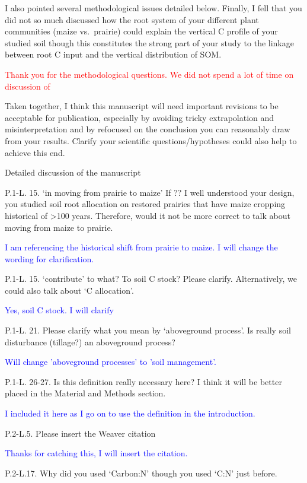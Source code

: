 \documentclass[]{article}
\begin{document}
I also pointed several methodological issues detailed below. Finally, I
fell that you did not so much discussed how the root system of your
different plant communities (maize vs.~prairie) could explain the
vertical C profile of your studied soil though this constitutes the
strong part of your study to the linkage between root C input and the
vertical distribution of SOM.

\textcolor{red}{Thank you for the methodological questions. We did not spend a lot of time on discussion of}

Taken together, I think this manuscript will need important revisions to
be acceptable for publication, especially by avoiding tricky
extrapolation and misinterpretation and by refocused on the conclusion
you can reasonably draw from your results. Clarify your scientific
questions/hypotheses could also help to achieve this end.

Detailed discussion of the manuscript

P.1-L. 15. `in moving from prairie to maize' If ?? I well understood
your design, you studied soil root allocation on restored prairies that
have maize cropping historical of \textgreater{}100 years. Therefore,
would it not be more correct to talk about moving from maize to prairie.

\textcolor{blue}{I am referencing the historical shift from prairie to maize. I will change the wording for clarification.}

P.1-L. 15. `contribute' to what? To soil C stock? Please clarify.
Alternatively, we could also talk about `C allocation'.

\textcolor{blue}{Yes, soil C stock. I will clarify}

P.1-L. 21. Please clarify what you mean by `aboveground process'. Is
really soil disturbance (tillage?) an aboveground process?

\textcolor{blue}{Will change 'aboveground processes' to 'soil management'.}

P.1-L. 26-27. Is this definition really necessary here? I think it will
be better placed in the Material and Methods section.

\textcolor{blue}{I included it here as I go on to use the definition in the introduction.}

P.2-L.5. Please insert the Weaver citation

\textcolor{blue}{Thanks for catching this, I will insert the citation.}

P.2-L.17. Why did you used `Carbon:N' though you used `C:N' just before.
\end{document}
